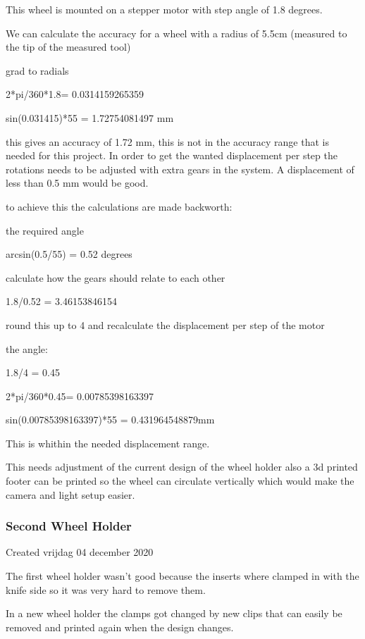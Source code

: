 This wheel is mounted on a stepper motor with step angle of 1.8 degrees.

We can calculate the accuracy for a wheel with a radius of 5.5cm (measured to the tip of the measured tool) 

grad to radials

2*pi/360*1.8= 0.0314159265359

sin(0.031415)*55 = 1.72754081497 mm



this gives an accuracy of 1.72 mm, this is not in the accuracy range that is needed for this project. In order to get the wanted displacement per step the rotations needs to be adjusted with extra gears in the system. A displacement of less than 0.5 mm would be good.



to achieve this the calculations are made backworth:

the required angle

arcsin(0.5/55) = 0.52 degrees 

calculate how the gears should relate to each other

1.8/0.52 = 3.46153846154



round this up to 4 and recalculate the displacement per step of the motor

the angle:

1.8/4 = 0.45

2*pi/360*0.45= 0.00785398163397

sin(0.00785398163397)*55 = 0.431964548879mm



This is whithin the needed displacement range.



This needs adjustment of the current design of the wheel holder also a 3d printed footer can be printed so the wheel can circulate vertically which would make the camera and light setup easier.

\subsubsection{Second Wheel Holder}

Created vrijdag 04 december 2020



The first wheel holder wasn't good because the inserts where clamped in with the knife side so it was very hard to remove them.

In a new wheel holder the clamps got changed by new clips that can easily be removed and printed again when the design changes. 

